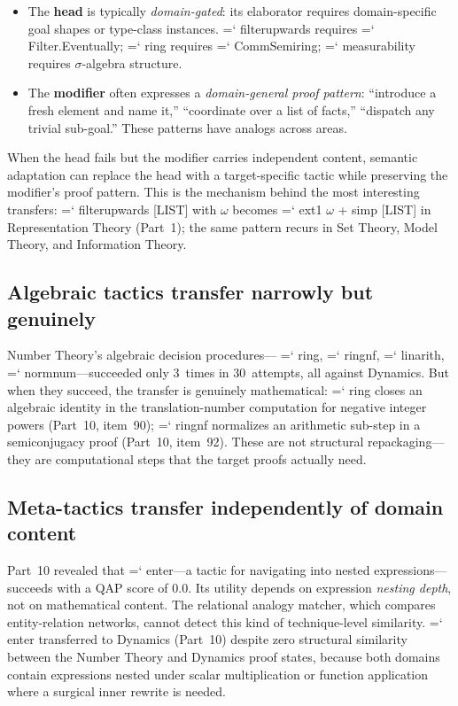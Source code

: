 \documentclass[11pt]{article}
\renewcommand{\texttt}[1]{%
  \begingroup\ttfamily\hyphenchar\font=`\-\relax
  \def\_{\textunderscore\discretionary{}{}{}}%
  #1\endgroup}
\theoremstyle{definition}
\theoremstyle{remark}
\begin{document}
\begin{itemize}
\item The \textbf{head} is typically \emph{domain-gated}: its
  elaborator requires domain-specific goal shapes or type-class
  instances.  \texttt{filter\_upwards} requires
  \texttt{Filter.Eventually}; \texttt{ring} requires
  \texttt{CommSemiring}; \texttt{measurability} requires
  $\sigma$-algebra structure.

\item The \textbf{modifier} often expresses a \emph{domain-general
  proof pattern}: ``introduce a fresh element and name it,''
  ``coordinate over a list of facts,'' ``dispatch any trivial
  sub-goal.''  These patterns have analogs across areas.
\end{itemize}

When the head fails but the modifier carries independent content,
semantic adaptation can replace the head with a target-specific
tactic while preserving the modifier's proof pattern.  This is the
mechanism behind the most interesting transfers: \texttt{filter\_upwards
[LIST] with $\omega$} becomes \texttt{ext1 $\omega$ + simp [LIST]}
in Representation Theory (Part~1); the same pattern recurs in Set
Theory, Model Theory, and Information Theory.

\subsection{Algebraic tactics transfer narrowly but genuinely}

Number Theory's algebraic decision procedures---\texttt{ring},
\texttt{ring\_nf}, \texttt{linarith}, \texttt{norm\_num}---succeeded
only 3~times in 30~attempts, all against Dynamics.  But when they
succeed, the transfer is genuinely mathematical: \texttt{ring}
closes an algebraic identity in the translation-number computation
for negative integer powers (Part~10, item~90); \texttt{ring\_nf}
normalizes an arithmetic sub-step in a semiconjugacy proof
(Part~10, item~92).  These are not structural repackaging---they
are computational steps that the target proofs actually need.

\subsection{Meta-tactics transfer independently of domain content}

Part~10 revealed that \texttt{enter}---a tactic for navigating into
nested expressions---succeeds with a QAP score of 0.0.  Its utility
depends on expression \emph{nesting depth}, not on mathematical
content.  The relational analogy matcher, which compares
entity-relation networks, cannot detect this kind of
technique-level similarity.  \texttt{enter} transferred to Dynamics
(Part~10) despite zero structural similarity between the Number
Theory and Dynamics proof states, because both domains contain
expressions nested under scalar multiplication or function
application where a surgical inner rewrite is needed.
\end{document}
